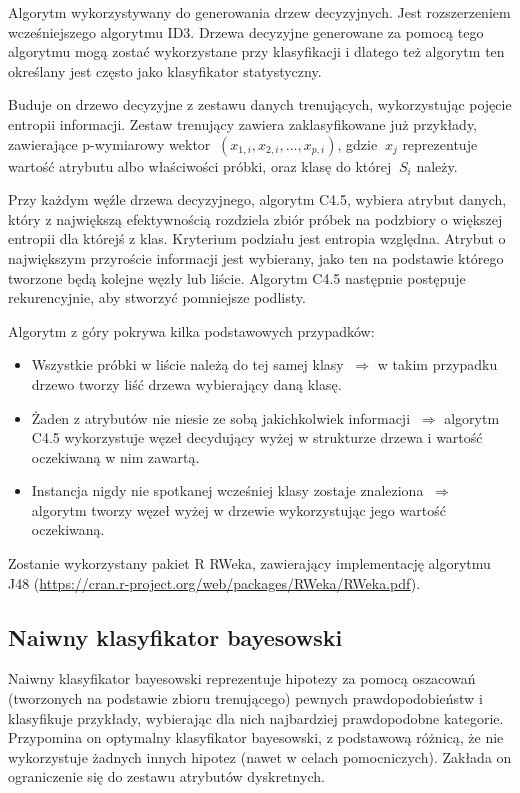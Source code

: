\documentclass[11pt]{article} %
\begin{document}
Algorytm wykorzystywany do generowania drzew decyzyjnych. Jest rozszerzeniem wcześniejszego algorytmu ID3. Drzewa decyzyjne generowane za pomocą tego algorytmu mogą zostać wykorzystane przy klasyfikacji i dlatego też algorytm ten określany jest często jako klasyfikator statystyczny.

Buduje on drzewo decyzyjne z zestawu danych trenujących, wykorzystując pojęcie entropii informacji. Zestaw trenujący zawiera zaklasyfikowane już przykłady, zawierające p-wymiarowy wektor $\ (x_{1,i}, x_{2,i}, …, x_{p,i}) $, gdzie $\ x_j $ reprezentuje wartość atrybutu albo właściwości próbki, oraz klasę do której $\ S_i $ należy.

Przy każdym węźle drzewa decyzyjnego, algorytm C4.5, wybiera atrybut danych, który z największą efektywnością rozdziela zbiór próbek na podzbiory o większej entropii dla którejś z klas. Kryterium podziału jest entropia względna. Atrybut o największym przyroście informacji jest wybierany, jako ten  na podstawie którego tworzone będą kolejne węzły lub liście. Algorytm C4.5 następnie postępuje rekurencyjnie, aby stworzyć pomniejsze podlisty.

Algorytm z góry pokrywa kilka podstawowych przypadków:

\begin{itemize}
\item Wszystkie próbki w liście należą do tej samej klasy $\ \Rightarrow $ w takim przypadku drzewo tworzy liść drzewa wybierający daną klasę.
\item Żaden z atrybutów nie niesie ze sobą jakichkolwiek informacji $\ \Rightarrow $ algorytm C4.5 wykorzystuje węzeł decydujący wyżej w strukturze drzewa i wartość oczekiwaną w nim zawartą.
\item Instancja nigdy nie spotkanej wcześniej klasy zostaje znaleziona $\ \Rightarrow $ algorytm tworzy węzeł wyżej w drzewie wykorzystując jego wartość oczekiwaną.
\end{itemize}

Zostanie wykorzystany pakiet R RWeka, zawierający implementację algorytmu J48
(\url{https://cran.r-project.org/web/packages/RWeka/RWeka.pdf}).

\subsection{Naiwny klasyfikator bayesowski}

Naiwny klasyfikator bayesowski reprezentuje hipotezy za pomocą oszacowań (tworzonych na podstawie zbioru trenującego) pewnych prawdopodobieństw i klasyfikuje przykłady, wybierając dla nich najbardziej prawdopodobne kategorie. Przypomina on optymalny klasyfikator bayesowski, z podstawową różnicą, że nie wykorzystuje żadnych innych hipotez (nawet w celach pomocniczych). Zakłada on ograniczenie się do zestawu atrybutów dyskretnych.
\end{document}

